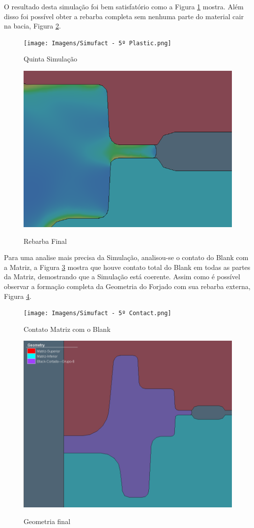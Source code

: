 \documentclass[deposito, acronym, symbols]{fei}
\begin{document}
O resultado desta simulação foi bem satisfatório como a Figura \ref{fig:Plastic} mostra. Além disso foi possível obter a rebarba completa sem nenhuma parte do material cair na bacia, Figura \ref{fig:Zoom}.

\begin{figure}[!htp]
    \centering
    \caption{Quinta Simulação}
    \texttt{[image: Imagens/Simufact - 5º Plastic.png]}
    \label{fig:Plastic}
\end{figure}

\begin{figure}[!htp]
    \centering
    \caption{Rebarba Final}
    \includegraphics[width=0.7\linewidth]{Imagens/Simufact - 5º Simulação.png}
    \label{fig:Zoom}
\end{figure}

\newpage

Para uma analise mais precisa da Simulação, analisou-se o contato do Blank com a Matriz, a Figura \ref{fig:Contact} mostra que houve contato total do Blank em todas as partes da Matriz, demostrando que a Simulação está coerente. Assim como é possível observar a formação completa da Geometria do Forjado com sua rebarba externa, Figura \ref{fig:5Geometria}.

\begin{figure}[!htp]
    \centering
    \caption{Contato Matriz com o Blank}
    \texttt{[image: Imagens/Simufact - 5º Contact.png]}
    \label{fig:Contact}
\end{figure}


\begin{figure}[!htp]
    \centering
    \caption{Geometria final}
    \includegraphics[width=0.7\linewidth]{Imagens/Simufact - 5Geometria.png}
    \label{fig:5Geometria}
\end{figure}
\end{document}
